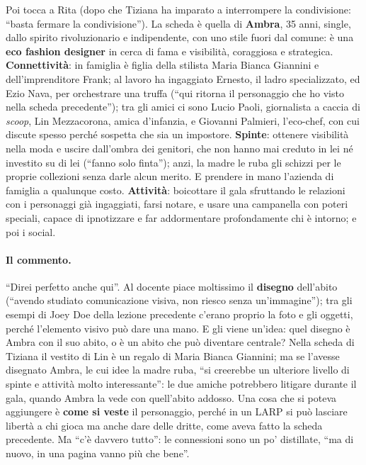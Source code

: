 Poi tocca a Rita (dopo che Tiziana ha imparato a interrompere la condivisione:
``basta fermare la condivisione''). La scheda è quella di \textbf{Ambra}, 35 anni,
single, dallo spirito rivoluzionario e indipendente, con uno stile fuori dal comune:
è una \textbf{eco fashion designer} in cerca di fama e visibilità, coraggiosa e
strategica. \textbf{Connettività}: in famiglia è figlia della stilista Maria Bianca
Giannini e dell'imprenditore Frank; al lavoro ha ingaggiato Ernesto, il ladro
specializzato, ed Ezio Nava, per orchestrare una truffa (``qui ritorna il
personaggio che ho visto nella scheda precedente''); tra gli amici ci sono Lucio
Paoli, giornalista a caccia di \emph{scoop}, Lin Mezzacorona, amica d'infanzia, e
Giovanni Palmieri, l'eco-chef, con cui discute spesso perché sospetta che sia un
impostore. \textbf{Spinte}: ottenere visibilità nella moda e uscire dall'ombra dei
genitori, che non hanno mai creduto in lei né investito su di lei (``fanno solo
finta''); anzi, la madre le ruba gli schizzi per le proprie collezioni senza darle
alcun merito. E prendere in mano l'azienda di famiglia a qualunque costo.
\textbf{Attività}: boicottare il gala sfruttando le relazioni con i personaggi già
ingaggiati, farsi notare, e usare una campanella con poteri speciali, capace di
ipnotizzare e far addormentare profondamente chi è intorno; e poi i social.

\paragraph{Il commento.} ``Direi perfetto anche qui''. Al docente piace moltissimo
il \textbf{disegno} dell'abito (``avendo studiato comunicazione visiva, non riesco
senza un'immagine''); tra gli esempi di Joey Doe della lezione precedente c'erano
proprio la foto e gli oggetti, perché l'elemento visivo può dare una mano. E gli
viene un'idea: quel disegno è Ambra con il suo abito, o è un abito che può
diventare centrale? Nella scheda di Tiziana il vestito di Lin è un regalo di Maria
Bianca Giannini; ma se l'avesse disegnato Ambra, le cui idee la madre ruba, ``si
creerebbe un ulteriore livello di spinte e attività molto interessante'': le due
amiche potrebbero litigare durante il gala, quando Ambra la vede con quell'abito
addosso. Una cosa che si poteva aggiungere è \textbf{come si veste} il personaggio,
perché in un LARP si può lasciare libertà a chi gioca ma anche dare delle dritte,
come aveva fatto la scheda precedente. Ma ``c'è davvero tutto'': le connessioni sono
un po' distillate, ``ma di nuovo, in una pagina vanno più che bene''.

